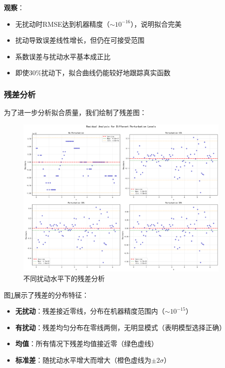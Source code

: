 \documentclass[a4paper,12pt]{article}
\theoremstyle{definition}
\begin{document}
\textbf{观察}：
\begin{itemize}
    \item 无扰动时RMSE达到机器精度（$\sim 10^{-16}$），说明拟合完美
    \item 扰动导致误差线性增长，但仍在可接受范围
    \item 系数误差与扰动水平基本成正比
    \item 即使30\%扰动下，拟合曲线仍能较好地跟踪真实函数
\end{itemize}

\subsubsection{残差分析}

为了进一步分析拟合质量，我们绘制了残差图：

\begin{figure}[H]
\centering
\includegraphics[width=0.95\textwidth]{results/task2/additional/residual_analysis.png}
\caption{不同扰动水平下的残差分析}
\label{fig:task2_residual}
\end{figure}

图\ref{fig:task2_residual}展示了残差的分布特征：
\begin{itemize}
    \item \textbf{无扰动}：残差接近零线，分布在机器精度范围内（$\sim 10^{-15}$）
    \item \textbf{有扰动}：残差均匀分布在零线两侧，无明显模式（表明模型选择正确）
    \item \textbf{均值}：所有情况下残差均值接近零（绿色虚线）
    \item \textbf{标准差}：随扰动水平增大而增大（橙色虚线为$\pm 2\sigma$）
\end{itemize}
\end{document}

